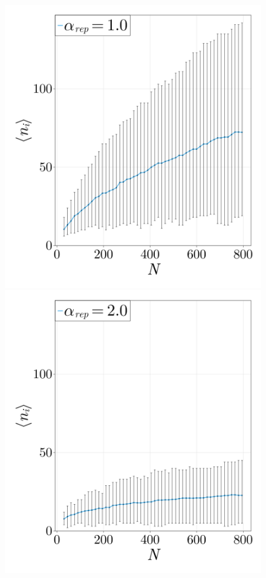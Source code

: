 \begin{figure}[p]
    \centering
    \begin{minipage}{0.49\textwidth}
        \centering
        \includegraphics[width=\linewidth]{figures/303/303-reps-ni-1.png} 
    \end{minipage}
    \begin{minipage}{0.49\textwidth}
        \centering
        \includegraphics[width=\linewidth]{figures/303/303-reps-ni-2.png} 

\end{minipage}
\end{figure}
